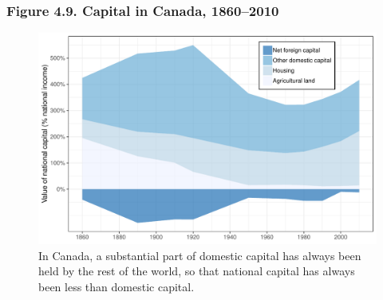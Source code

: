 \documentclass[t]{beamer}\usepackage[]{graphicx}\usepackage[]{color}
\newenvironment{knitrout}{}{} %
\begin{document}
\begin{frame}[label=Figure_4_9]
\frametitle{Figure 4.9. Capital in Canada, 1860--2010}
\begin{figure}[t]
\begin{minipage}[b]{\textwidth}
\centering
\begin{knitrout}\footnotesize
{}\color{fgcolor}

{\centering \includegraphics[width=1\linewidth]{figures/color/Figure_4_9} 

}



\end{knitrout}
\caption{In Canada, a substantial part of domestic capital has always been held by the rest of the world, so that national capital has always been less than domestic capital.}
\end{minipage}
\end{figure}
\end{frame}
\end{document}
